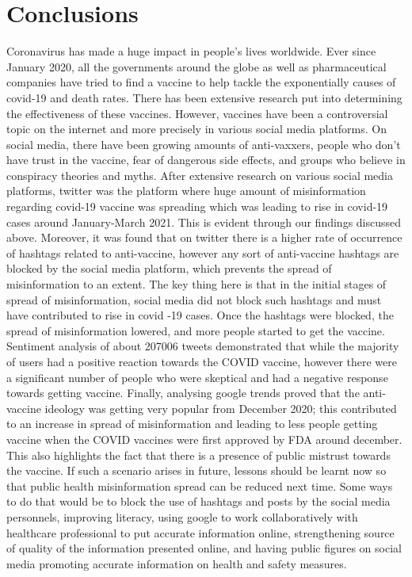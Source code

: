 \documentclass[10pt,twocolumn,letterpaper]{article}
\begin{document}
 


\section*{Conclusions}
    Coronavirus has made a huge impact in people's lives worldwide. Ever since January 2020,  all the governments around the globe as well as pharmaceutical companies  have tried to find a vaccine to help tackle the exponentially causes of covid-19 and death rates.  There has been extensive research put into determining the effectiveness of these vaccines. However, vaccines have been a controversial topic on the internet and more precisely in various social media platforms. On social media, there have been growing amounts of anti-vaxxers, people who don't have trust in the vaccine, fear of dangerous side effects, and  groups who believe in conspiracy theories and myths. After extensive research on various social media platforms, twitter was the platform where huge amount of misinformation regarding covid-19 vaccine was spreading which was leading to rise in covid-19 cases around January-March 2021. This is evident through our findings discussed above. Moreover, it was found that on twitter there is a higher rate of occurrence of hashtags related to anti-vaccine, however any sort of anti-vaccine hashtags are blocked by the social media platform, which prevents the spread of misinformation to an extent.  The key thing here is that in the initial stages of spread of misinformation, social media did not block such hashtags and must have contributed to rise in covid -19 cases. Once the hashtags were blocked, the spread of misinformation lowered, and more people started to get the vaccine.  Sentiment analysis of about 207006 tweets demonstrated  that while the majority of users had a positive reaction towards the COVID vaccine, however there were a significant number of people who were skeptical and had a negative response towards getting vaccine. Finally, analysing google trends proved that the anti-vaccine ideology  was getting very popular from December 2020; this contributed to an increase in spread of misinformation and leading to less people getting vaccine when the COVID vaccines were first approved by FDA around december. This also highlights the fact that there is a  presence of public mistrust towards the vaccine. If such a scenario arises in future, lessons should be learnt now so that public health misinformation spread can be reduced next time. Some ways to do that would be to block the use of hashtags and posts by the social media personnels, improving literacy, using google to work collaboratively with healthcare professional to put accurate information online, strengthening source of quality of the information presented online, and having public figures on social media promoting accurate information on health and safety measures. 
\end{document}
